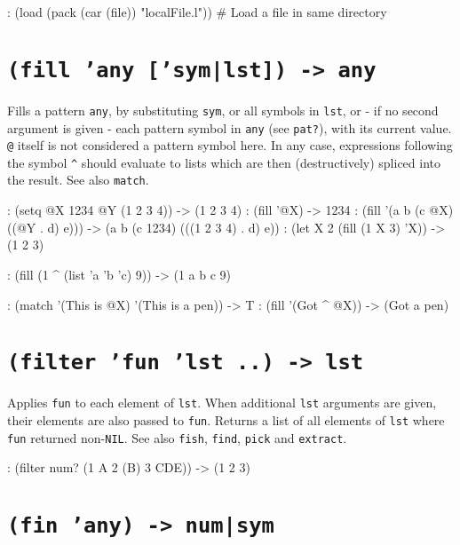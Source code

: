 \begin{wideverbatim}
: (load (pack (car (file)) "localFile.l"))  # Load a file in same directory
\end{wideverbatim}

 
\section*{\texttt{(fill 'any ['sym|lst]) -> any}}
\label{sec:func-ref-F-(fill 'any ['sym|lst]) -> any}


Fills a pattern \texttt{any}, by substituting \texttt{sym}, or all symbols in \texttt{lst},
or - if no second argument is given - each pattern symbol in \texttt{any} (see
\texttt{pat?}), with its current value. \texttt{@} itself is not considered a pattern
symbol here. In any case, expressions following the symbol \texttt{\textasciicircum{}} should
evaluate to lists which are then (destructively) spliced into the
result. See also \texttt{match}.


\begin{wideverbatim}
: (setq  @X 1234  @Y (1 2 3 4))
-> (1 2 3 4)
: (fill '@X)
-> 1234
: (fill '(a b (c @X) ((@Y . d) e)))
-> (a b (c 1234) (((1 2 3 4) . d) e))
: (let X 2 (fill (1 X 3) 'X))
-> (1 2 3)

: (fill (1 ^ (list 'a 'b 'c) 9))
-> (1 a b c 9)

: (match '(This is @X) '(This is a pen))
-> T
: (fill '(Got ^ @X))
-> (Got a pen)
\end{wideverbatim}

 
\section*{\texttt{(filter 'fun 'lst ..) -> lst}}
\label{sec:func-ref-F-(filter 'fun 'lst ..) -> lst}


Applies \texttt{fun} to each element of \texttt{lst}. When additional \texttt{lst} arguments
are given, their elements are also passed to \texttt{fun}. Returns a list of
all elements of \texttt{lst} where \texttt{fun} returned non-\texttt{NIL}. See also \texttt{fish},
\texttt{find}, \texttt{pick} and \texttt{extract}.


\begin{wideverbatim}
: (filter num? (1 A 2 (B) 3 CDE))
-> (1 2 3)
\end{wideverbatim}

 
\section*{\texttt{(fin 'any) -> num|sym}}
\label{sec:func-ref-F-(fin 'any) -> num|sym}


